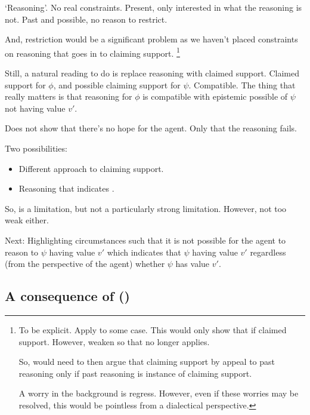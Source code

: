 \begin{note}[`Reasoning']
  `Reasoning'.
  No real constraints.
  Present, only interested in what the reasoning is not.
  Past and possible, no reason to restrict.

    And, restriction would be a significant problem as we haven't placed constraints on reasoning that goes in to claiming support.\nolinebreak
  \footnote{
    To be explicit.
    Apply \LCS{} to some case.
    This would only show that if claimed support.
    However, weaken so that \LCS{} no longer applies.

    So, would need to then argue that claiming support by appeal to past reasoning only if past reasoning is instance of claiming support.

    A worry in the background is regress.
    However, even if these worries may be resolved, this would be pointless from a dialectical perspective.
  }

  Still, a natural reading to do is replace reasoning with claimed support.
  Claimed support for \(\phi\), and possible claiming support for \(\psi\).
  Compatible.
  The thing that really matters is that reasoning for \(\phi\) is compatible with epistemic possible of \(\psi\) not having value \(v'\).
\end{note}

\begin{note}
  Does not show that there's no hope for the agent.
  Only that the reasoning fails.

  Two possibilities:
  \begin{itemize}
  \item Different approach to claiming support.
  \item Reasoning that indicates \cprequ{}.
  \end{itemize}

  So, \LCS{} is a limitation, but not a particularly strong limitation.
  However, not too weak either.

  Next:
  Highlighting circumstances such that it is not possible for the agent to reason to \(\psi\) having value \(v'\) which indicates that \(\psi\) having value \(v'\) regardless (from the perspective of the agent) whether \(\psi\) has value \(v'\).
\end{note}


\subsection{A consequence of \LCS{} ()}
\label{sec:fcs}


